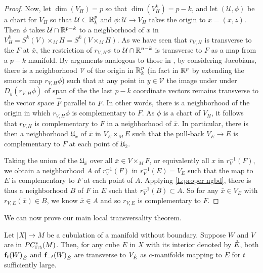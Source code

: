 \begin{proof}
	Now, let $\dim(V_H) = p$ so that $\dim(V_H^k) = p - k$, and let $(\mathcal U, \phi)$ be a chart for $V_H$ so that $\mathcal U \subset \mathbb{R}^p_k$ and $\phi \colon \mathcal U \to V_H$ takes the origin to $\bar{x} = (x,z)$.
	Then $\phi$ takes $\mathcal U \cap \mathbb{R}^{p-k}$ to a neighborhood of $x$ in $V_H^k = S^k(V) \times_M H = S^k(V \times_M H)$.
	As we have seen that $r_{V,H}$ is transverse to the $F$ at $\bar{x}$, the restriction of $r_{V,H} \phi$ to $\mathcal U \cap \mathbb{R}^{n-k}$ is transverse to $F$ as a map from a $p-k$ manifold.
	By arguments analogous to those in \cite[Section 1.6]{GuPo74}, by considering Jacobians, there is a neighborhood $\mathcal V$ of the origin in $\mathbb{R}^p_k$ (in fact in $\mathbb{R}^p$ by extending the smooth map $r_{V,H} \phi$) such that at any point in $y \in \mathcal V$ the image under under $D_y(r_{V,H} \phi)$ of span of the the last $p-k$ coordinate vectors remains transverse to the vector space $\vec F$ parallel to $F$.
	In other words, there is a neighborhood of the origin in which $r_{V,H} \phi$ is complementary to $F$.
	As $\phi$ is a chart of $V_H$, it follows that $r_{V,H}$ is complementary to $F$ in a neighborhood of $\bar{x}$.
	In particular, there is then a neighborhood $\mathfrak U_{\bar{x}}$ of $\bar{x}$ in $V_E \times_M E$ such that the pull-back $V_E \to E$ is complementary to $F$ at each point of $\mathfrak U_{\bar{x}}$.

	Taking the union of the $\mathfrak U_{\bar{x}}$ over all $\bar{x} \in V \times_M F$, or equivalently all $x$ in $r_V^{-1}(F)$, we obtain a neighborhood $A$ of $r_V^{-1}(F)$ in  $r_V^{-1}(E) = V_E$ such that the map to $E$ is complementary to $F$ at each point of $A$.
	Applying \cref{L:proper ngbd}, there is thus a neighborhood $B$ of $F$ in $E$ such that $r_V^{-1}(B) \subset A$.
	So for any $\bar{x} \in V_E$ with $r_{V,E} (\bar{x}) \in B$, we know $\bar{x} \in A$ and so $r_{V,E}$ is complementary to $F$.
\end{proof}

We can now prove our main local transversality theorem.


\begin{theorem}\label{T:transversality}
	Let $|X| \to M$ be a cubulation of a manifold without boundary.
	Suppose $W$ and $V$ are in $PC_{\Gamma \pitchfork}^*(M)$.
	Then, for any cube $E$ in $X$ with its interior denoted by $\mathring{E}$, both $\mathbf{f}_t(W)_{\mathring{E}}$ and $\mathbf{f}_{-t}(W)_{\mathring{E}}$ are transverse to $V_{\mathring{E}}$ as c-manifolds mapping to $E$  for $t$ sufficiently large.
\end{theorem}

